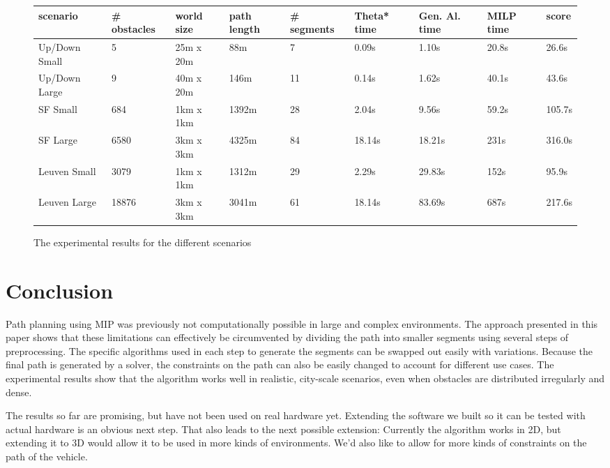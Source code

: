 \begin{figure}
\begin{tabular}{ l l l l l l l l l }
 scenario & \# obstacles & world size & path length & \# segments & Theta* time & Gen. Al. time & MILP time & score \\ 
 \hline
Up/Down Small & 5 &  25m x 20m & 88m  & 7 & 0.09s & 1.10s & 20.8s & 26.6s\\
Up/Down Large & 9 & 40m x 20m &  146m & 11 & 0.14s & 1.62s & 40.1s & 43.6s \\
SF Small & 684 & 1km x 1km & 1392m & 28 & 2.04s & 9.56s & 59.2s & 105.7s \\
SF Large & 6580 & 3km x 3km & 4325m  & 84 & 18.14s & 18.21s & 231s & 316.0s\\
Leuven Small & 3079 & 1km x 1km & 1312m & 29 &  2.29s & 29.83s & 152s  & 95.9s \\
Leuven Large & 18876 & 3km x 3km & 3041m & 61 & 18.14s & 83.69s & 687s & 217.6s \\

\end{tabular}
\caption{The experimental results for the different scenarios}
\label{table:results}
\end{figure}

\section{Conclusion}
Path planning using MIP was previously not computationally possible in large and complex environments. The approach presented in this paper shows that these limitations can effectively be circumvented by dividing the path into smaller segments using several steps of preprocessing. The specific algorithms used in each step to generate the segments can be swapped out easily with variations. Because the final path is generated by a solver, the constraints on the path can also be easily changed to account for different use cases. The experimental results show that the algorithm works well in realistic, city-scale scenarios, even when obstacles are distributed irregularly and dense.

The results so far are promising, but have not been used on real hardware yet. Extending the software we built so it can be tested with actual hardware is an obvious next step. That also leads to the next possible extension: Currently the algorithm works in 2D, but extending it to 3D would allow it to be used in more kinds of environments. We'd also like to allow for more kinds of constraints on the path of the vehicle.